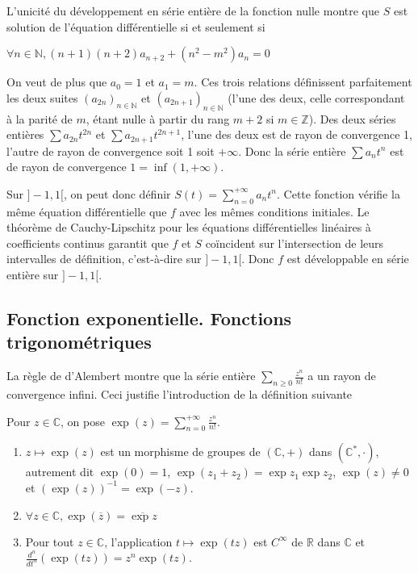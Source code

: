\begin{ex}
L'unicité du développement en série entière de la fonction nulle montre que $S$ est solution de l'équation différentielle si et seulement si

$\forall n \in \mathbb{N}, (n+1)(n+2) a_{n+2} + (n^2-m^2) a_n = 0$

On veut de plus que $a_0 = 1$ et $a_1 = m$. Ces trois relations définissent parfaitement les deux suites $(a_{2n})_{n \in \mathbb{N}}$ et $(a_{2n+1})_{n \in \mathbb{N}}$ (l'une des deux, celle correspondant à la parité de $m$, étant nulle à partir du rang $m+2$ si $m \in \mathbb{Z}$). Des deux séries entières $\sum a_{2n} t^{2n}$ et $\sum a_{2n+1} t^{2n+1}$, l'une des deux est de rayon de convergence 1, l'autre de rayon de convergence soit 1 soit $+\infty$. Donc la série entière $\sum a_n t^n$ est de rayon de convergence $1 = \inf(1,+\infty)$.

Sur $]-1,1[$, on peut donc définir $S(t) = \sum_{n=0}^{+\infty} a_n t^n$. Cette fonction vérifie la même équation différentielle que $f$ avec les mêmes conditions initiales. Le théorème de Cauchy-Lipschitz pour les équations différentielles linéaires à coefficients continus garantit que $f$ et $S$ coïncident sur l'intersection de leurs intervalles de définition, c'est-à-dire sur $]-1,1[$. Donc $f$ est développable en série entière sur $]-1,1[$.
\end{ex}

\subsection{Fonction exponentielle. Fonctions trigonométriques}

La règle de d'Alembert montre que la série entière $\sum_{n \geq 0} \frac{z^n}{n!}$ a un rayon de convergence infini. Ceci justifie l'introduction de la définition suivante

\begin{de}
Pour $z \in \mathbb{C}$, on pose $\exp(z) = \sum_{n=0}^{+\infty} \frac{z^n}{n!}$.
\end{de}

\begin{prop}
\begin{enumerate}
\item $z \mapsto \exp(z)$ est un morphisme de groupes de $(\mathbb{C},+)$ dans $(\mathbb{C}^*,\cdot)$, autrement dit $\exp(0) = 1$, $\exp(z_1 + z_2) = \exp z_1 \exp z_2$, $\exp(z) \neq 0$ et $(\exp(z))^{-1} = \exp(-z)$.
\item $\forall z \in \mathbb{C}, \exp(\overline{z}) = \overline{\exp z}$
\item Pour tout $z \in \mathbb{C}$, l'application $t \mapsto \exp(tz)$ est $C^\infty$ de $\mathbb{R}$ dans $\mathbb{C}$ et $\frac{d^n}{dt^n}(\exp(tz)) = z^n \exp(tz)$.
\end{enumerate}
\end{prop}


